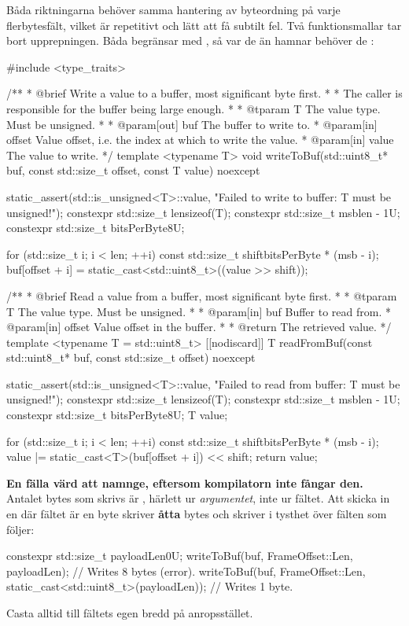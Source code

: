 Båda riktningarna behöver samma hantering av byteordning på varje flerbytesfält, vilket är
repetitivt och lätt att få subtilt fel. Två funktionsmallar tar bort upprepningen. Båda begränsar
 med , så var de än hamnar behöver de :

\begin{cppcode}
#include <type_traits>

/**
 * @brief Write a value to a buffer, most significant byte first.
 *
 *        The caller is responsible for the buffer being large enough.
 *
 * @tparam T The value type. Must be unsigned.
 *
 * @param[out] buf The buffer to write to.
 * @param[in] offset Value offset, i.e. the index at which to write the value.
 * @param[in] value  The value to write.
 */
template <typename T>
void writeToBuf(std::uint8_t* buf, const std::size_t offset, const T value) noexcept
{
    static_assert(std::is_unsigned<T>::value, "Failed to write to buffer: T must be unsigned!");
    constexpr std::size_t len{sizeof(T)};
    constexpr std::size_t msb{len - 1U};
    constexpr std::size_t bitsPerByte{8U};

    for (std::size_t i{}; i < len; ++i)
    {
        const std::size_t shift{bitsPerByte * (msb - i)};
        buf[offset + i] = static_cast<std::uint8_t>((value >> shift));
    }
}

/**
 * @brief Read a value from a buffer, most significant byte first.
 *
 * @tparam T The value type. Must be unsigned.
 *
 * @param[in] buf Buffer to read from.
 * @param[in] offset Value offset in the buffer.
 *
 * @return The retrieved value.
 */
template <typename T = std::uint8_t>
[[nodiscard]] T readFromBuf(const std::uint8_t* buf, const std::size_t offset) noexcept
{
    static_assert(std::is_unsigned<T>::value, "Failed to read from buffer: T must be unsigned!");
    constexpr std::size_t len{sizeof(T)};
    constexpr std::size_t msb{len - 1U};
    constexpr std::size_t bitsPerByte{8U};
    T value{};

    for (std::size_t i{}; i < len; ++i)
    {
        const std::size_t shift{bitsPerByte * (msb - i)};
        value |= static_cast<T>(buf[offset + i]) << shift;
    }
    return value;
}
\end{cppcode}

\begin{warning}
\textbf{En fälla värd att namnge, eftersom kompilatorn inte fångar den.} Antalet bytes som skrivs är
, härlett ur \emph{argumentet}, inte ur fältet. Att skicka in en 
där fältet är en byte skriver \textbf{åtta} bytes och skriver i tysthet över fälten som följer:

\begin{cppcode}
constexpr std::size_t payloadLen{0U};
writeToBuf(buf, FrameOffset::Len, payloadLen);                            // Writes 8 bytes (error).
writeToBuf(buf, FrameOffset::Len, static_cast<std::uint8_t>(payloadLen)); // Writes 1 byte.
\end{cppcode}

Casta alltid till fältets egen bredd på anropsstället.
\end{warning}

